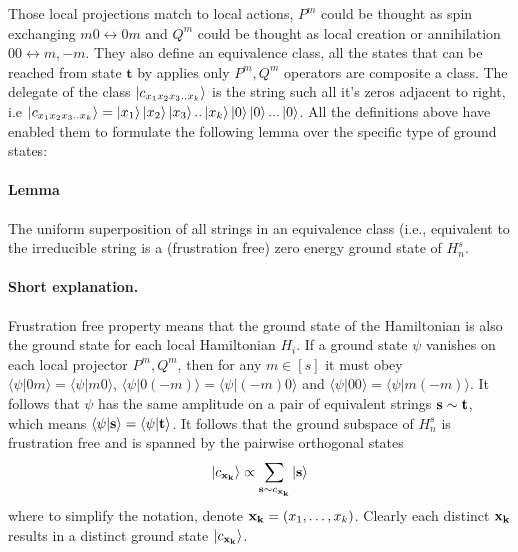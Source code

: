 \documentclass{article}
\begin{document}
Those local projections match to local actions, \(P^m\) could be thought as spin exchanging \( m0 \leftrightarrow 0m \) and \(Q^m\) could be thought as local creation or annihilation \(00 \leftrightarrow m,-m\). They also define an equivalence class, all the states that can be reached from state \( \mathbf{t} \) by applies only \( P^m, Q^m\) operators are composite a class. The delegate of the class \( \ket{c_{x_1 x_2 x_3 .. x_k}} \) is the string such all it's zeros  adjacent to right, i.e \(  \ket{c_{x_1 x_2 x_3 .. x_k}} = \ket{x_1}\ket{x_2}\ket{x_3}..\ket{x_k}\ket{0}\ket{0}...\ket{0} \). All the definitions above have enabled them to formulate the following lemma over the specific type of ground states:      

\paragraph{Lemma} The uniform superposition of all strings in an equivalence
class (i.e., equivalent to the irreducible string 
 is a (frustration free) zero energy ground state of $H^s_n$.

\paragraph{Short explanation.} Frustration free property means that the ground state of the Hamiltonian is also the ground state for each local Hamiltonian \(H_i\). If a ground state $\psi$ vanishes
on each local projector \(P^m , Q^m\), then for any $m\in[s]$ it must obey $\langle\psi|0m\rangle=\langle\psi|m0\rangle$,
$\langle\psi|0(-m)\rangle=\langle\psi|(-m)0\rangle$ and $\langle\psi|00\rangle=\langle\psi|m(-m)\rangle$.
It follows that $\psi$ has the same amplitude on a pair of equivalent
strings ${\bf s}\sim{\bf t}$, which means $\langle\psi|{\bf s}\rangle=\langle\psi|{\bf t}\rangle$.
It follows that the ground subspace of $H_{n}^{s}$ is frustration
free and is spanned by the pairwise orthogonal states
\begin{equation}
|c_{{\bf x_{k}}}\rangle\propto\sum_{{\bf s}\sim c_{{\bf x_{k}}}}|{\bf s}\rangle\label{eq:AllGroundStates}
\end{equation}
where to simplify the notation, denote ${\bf x_{k}}=(x_{1},\dots,x_{k})$.
Clearly each distinct ${\bf x_{k}}$ results in a distinct ground
state $|c_{{\bf x_{k}}}\rangle$. 
\end{document}
